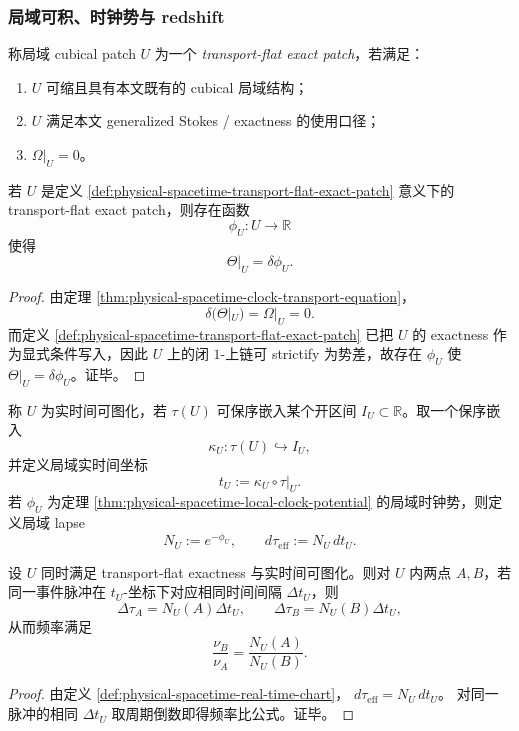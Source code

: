 \subsubsection{局域可积、时钟势与 redshift}

\begin{definition}\label{def:physical-spacetime-transport-flat-exact-patch}
称局域 cubical patch \(U\) 为一个 \emph{transport-flat exact patch}，若满足：
\begin{enumerate}
  \item \(U\) 可缩且具有本文既有的 cubical 局域结构；
  \item \(U\) 满足本文 generalized Stokes / exactness 的使用口径；
  \item \(\Omega|_U=0\)。
\end{enumerate}
\end{definition}

\begin{theorem}[局域时钟势]\label{thm:physical-spacetime-local-clock-potential}
若 \(U\) 是定义 \ref{def:physical-spacetime-transport-flat-exact-patch} 意义下的 transport-flat exact patch，则存在函数
\[
\phi_U:U\to\mathbb R
\]
使得
\[
\Theta|_U=\delta\phi_U.
\]
\end{theorem}
\begin{proof}
由定理 \ref{thm:physical-spacetime-clock-transport-equation}，
\[
\delta(\Theta|_U)=\Omega|_U=0.
\]
而定义 \ref{def:physical-spacetime-transport-flat-exact-patch} 已把 \(U\) 的 exactness 作为显式条件写入，因此 \(U\) 上的闭 \(1\)-上链可 strictify 为势差，故存在 \(\phi_U\) 使 \(\Theta|_U=\delta\phi_U\)。证毕。
\end{proof}

\begin{definition}\label{def:physical-spacetime-real-time-chart}
称 \(U\) 为实时间可图化，若 \(\tau(U)\) 可保序嵌入某个开区间 \(I_U\subset\mathbb R\)。取一个保序嵌入
\[
\kappa_U:\tau(U)\hookrightarrow I_U,
\]
并定义局域实时间坐标
\[
t_U:=\kappa_U\circ\tau|_U.
\]
若 \(\phi_U\) 为定理 \ref{thm:physical-spacetime-local-clock-potential} 的局域时钟势，则定义局域 lapse
\[
N_U:=e^{-\phi_U},
\qquad
d\tau_{\mathrm{eff}}:=N_U\,dt_U.
\]
\end{definition}

\begin{corollary}[局域 redshift 公式]\label{cor:physical-spacetime-local-redshift}
设 \(U\) 同时满足 transport-flat exactness 与实时间可图化。则对 \(U\) 内两点 \(A,B\)，若同一事件脉冲在 \(t_U\)-坐标下对应相同时间间隔 \(\Delta t_U\)，则
\[
\Delta\tau_A=N_U(A)\Delta t_U,\qquad
\Delta\tau_B=N_U(B)\Delta t_U,
\]
从而频率满足
\[
\frac{\nu_B}{\nu_A}=\frac{N_U(A)}{N_U(B)}.
\]
\end{corollary}
\begin{proof}
由定义 \ref{def:physical-spacetime-real-time-chart}，
\(
d\tau_{\mathrm{eff}}=N_U\,dt_U
\)。
对同一脉冲的相同 \(\Delta t_U\) 取周期倒数即得频率比公式。证毕。
\end{proof}

